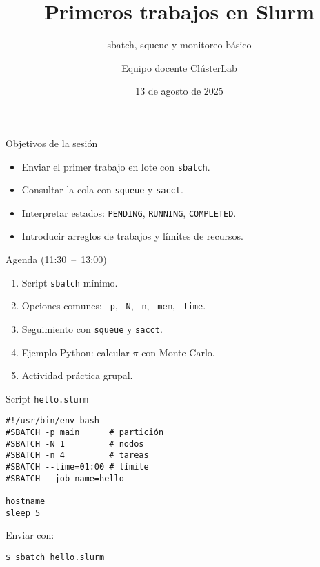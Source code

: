 \documentclass[aspectratio=169,professionalfonts]{beamer}
\title[ClústerLab • Día 5]{Primeros trabajos en Slurm}
\subtitle{sbatch, squeue y monitoreo básico}
\author{Equipo docente ClústerLab}
\date{13 de agosto de 2025}
\begin{document}
\begin{frame}[plain]
  \titlepage
\end{frame}

\begin{frame}[fragile]{Objetivos de la sesión}
  \begin{itemize}
    \item Enviar el primer trabajo en lote con \texttt{sbatch}.
    \item Consultar la cola con \texttt{squeue} y \texttt{sacct}.
    \item Interpretar estados: \texttt{PENDING}, \texttt{RUNNING}, \texttt{COMPLETED}.
    \item Introducir arreglos de trabajos y límites de recursos.
  \end{itemize}
\end{frame}

\begin{frame}[fragile]{Agenda (11:30 – 13:00)}
  \begin{enumerate}
    \item Script \texttt{sbatch} mínimo.
    \item Opciones comunes: \texttt{-p}, \texttt{-N}, \texttt{-n}, \texttt{--mem}, \texttt{--time}.
    \item Seguimiento con \texttt{squeue} y \texttt{sacct}.
    \item Ejemplo Python: calcular \(\pi\) con Monte‑Carlo.
    \item Actividad práctica grupal.
  \end{enumerate}
\end{frame}

\begin{frame}[fragile]{Script \texttt{hello.slurm}}
  \begin{verbatim}
#!/usr/bin/env bash
#SBATCH -p main      # partición
#SBATCH -N 1         # nodos
#SBATCH -n 4         # tareas
#SBATCH --time=01:00 # límite
#SBATCH --job-name=hello

hostname
sleep 5
  \end{verbatim}
  Enviar con:
  \begin{verbatim}
$ sbatch hello.slurm
  \end{verbatim}
\end{frame}
\end{document}
